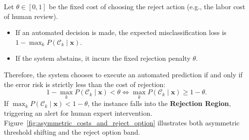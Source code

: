 Let $\theta \in [0, 1]$ be the fixed cost of choosing the reject action (e.g., the labor cost of human review).
\begin{itemize}[noitemsep]
  \item If an automated decision is made, the expected misclassification loss is $1 - \max_k P(\mathcal{C}_k \mid \mathbf{x})$.
  \item If the system abstains, it incurs the fixed rejection penalty $\theta$.
\end{itemize}
Therefore, the system chooses to execute an automated prediction if and only if the error risk is strictly less than the cost of rejection:
\begin{equation}
1 - \max_{k} P(\mathcal{C}_k \mid \mathbf{x}) < \theta \iff \max_{k} P(\mathcal{C}_k \mid \mathbf{x}) \ge 1 - \theta.
\label{eq:reject_option_condition}
\end{equation}
If $\max_k P(\mathcal{C}_k \mid \mathbf{x}) < 1 - \theta$, the instance falls into the \textbf{Rejection Region}, triggering an alert for human expert intervention. Figure~\ref{fig:asymmetric_costs_and_reject_option} illustrates both asymmetric threshold shifting and the reject option band.

